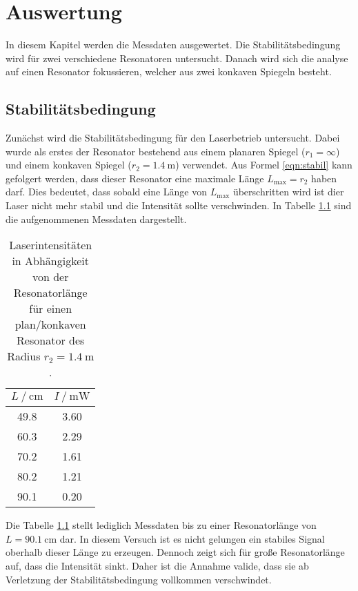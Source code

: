 \chapter{Auswertung}
\label{cha:Auswertung}

In diesem Kapitel werden die Messdaten ausgewertet. Die Stabilitätsbedingung wird für zwei verschiedene Resonatoren untersucht. Danach wird sich die analyse auf einen Resonator 
fokussieren, welcher aus zwei konkaven Spiegeln besteht.

\section{Stabilitätsbedingung}
\label{sec:stabil}
Zunächst wird die Stabilitätsbedingung für den Laserbetrieb untersucht. Dabei wurde als erstes der Resonator bestehend aus einem planaren Spiegel ($r_1 = \infty$) und einem
konkaven Spiegel ($r_2 = \qty{1.4}{\metre}$) verwendet. 
Aus Formel \ref{eqn:stabil} kann gefolgert werden, dass dieser Resonator eine maximale Länge $L_\text{max} = r_2$ haben darf. Dies bedeutet, dass sobald eine Länge von $L_\text{max}$
überschritten wird ist dier Laser nicht mehr stabil und die Intensität sollte verschwinden. In Tabelle \ref{tab:stabil_plan} sind die aufgenommenen Messdaten dargestellt. 

\begin{table}
    \centering
    
    \begin{tabular}{c c}
        \toprule
        {$ L \mathbin{/} \unit{\centi\metre}$} & {$I \mathbin{/} \unit{\milli\watt}$}\\
        \midrule
        49.8 & 3.60 \\ 
        60.3 & 2.29 \\
        70.2 & 1.61 \\
        80.2 & 1.21 \\
        90.1 & 0.20 \\
        \bottomrule
    \end{tabular}
    \caption{Laserintensitäten in Abhängigkeit von der Resonatorlänge für einen plan/konkaven Resonator des Radius $r_2 = \qty{1.4}{\metre}$.}
    \label{tab:stabil_plan}
\end{table}

Die Tabelle \ref{tab:stabil_plan} stellt lediglich Messdaten bis zu einer Resonatorlänge von $L = \qty{90.1}{\centi\metre}$ dar. In diesem Versuch ist es nicht gelungen ein stabiles 
Signal oberhalb dieser Länge zu erzeugen. Dennoch zeigt sich für große Resonatorlänge auf, dass die Intensität sinkt. Daher ist die Annahme valide, dass sie ab Verletzung der 
Stabilitätsbedingung vollkommen verschwindet.

